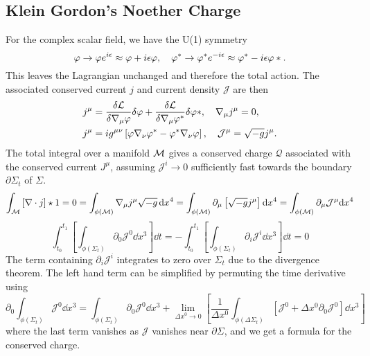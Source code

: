 \subsection{Klein Gordon's Noether Charge}
For the complex scalar field, we have the U(1) symmetry
\begin{equation}\varphi \rightarrow \varphi e^{i\epsilon} \approx \varphi + i\epsilon \varphi , \quad\varphi^* \rightarrow \varphi^* e^{-i\epsilon}  \approx \varphi^* - i\epsilon \varphi*.\end{equation}
This leaves the Lagrangian unchanged and therefore the total action. The associated conserved current $j$ and current density $\mathcal{J}$ are then
\begin{align*} j^\mu &= \frac{\delta \mathcal{L}}{\delta \nabla_\mu\varphi}\delta \varphi + \frac{\delta \mathcal{L}}{\delta \nabla_\mu \varphi^*}\delta \varphi*, \quad \nabla_\mu j^\mu =0,\\
 j^\mu &=  ig^{\mu\nu}\left[\varphi\nabla_\nu\varphi^* - \varphi^*\nabla_\nu\varphi\right], \quad \mathcal{J}^\mu = \sqrt{-g}j^\mu.\end{align*}
The total integral over a manifold $\mathcal{M}$ gives a conserved charge $\mathcal{Q}$ associated with the conserved current $J^\mu$, assuming $\mathcal{J}^i\rightarrow0$ sufficiently fast towards the boundary $\partial \Sigma_t$ of $\Sigma$.
\begin{equation}\int_{\mathcal{M}} \left[\nabla \cdot j\right] \star 1 = 0 = \int_{\phi(\mathcal{M})} \nabla_\mu j^\mu \sqrt{-g}\,\mathrm{d} x^4 = \int_{\phi(\mathcal{M})} \partial_\mu \left[\sqrt{-g} j^{\mu} \right] \mathrm{d} x^4= \int_{\phi(\mathcal{M})}\partial_\mu \mathcal{J}^\mu \mathrm{d} x^4\end{equation}
\begin{equation} \int^{t_1}_{t_0}\left[\int_{\phi(\Sigma_t)} \partial_0 \mathcal{J}^0 \dd x^3 \right]\dd t = -\int^{t_1}_{t_0}\left[\int_{\phi(\Sigma_t)} \partial_i \mathcal{J}^i \dd x^3 \right]\dd t = 0\end{equation}
The term containing $\partial_i\mathcal{J}^i$ integrates to zero over $\Sigma_t$ due to the divergence theorem. The left hand term can be simplified by permuting the time derivative using
\begin{equation} \partial_0 \int_{\phi(\Sigma_t)}\mathcal{J}^0 \dd x^3 = \int_{\phi(\Sigma_t)}\partial_0 \mathcal{J}^0 \dd x^3 + \lim_{\Delta x^0\rightarrow0}\left[ \frac{1}{\Delta x^0}\int_{\phi(\Delta \Sigma_t)}\left[ \mathcal{J}^0 +\Delta x^0 \partial_0 \mathcal{J}^0\right] \dd x^3 \right]\end{equation}
where the last term vanishes as $\mathcal{J}$ vanishes near $\partial\Sigma$, and we get a formula for the conserved charge.
